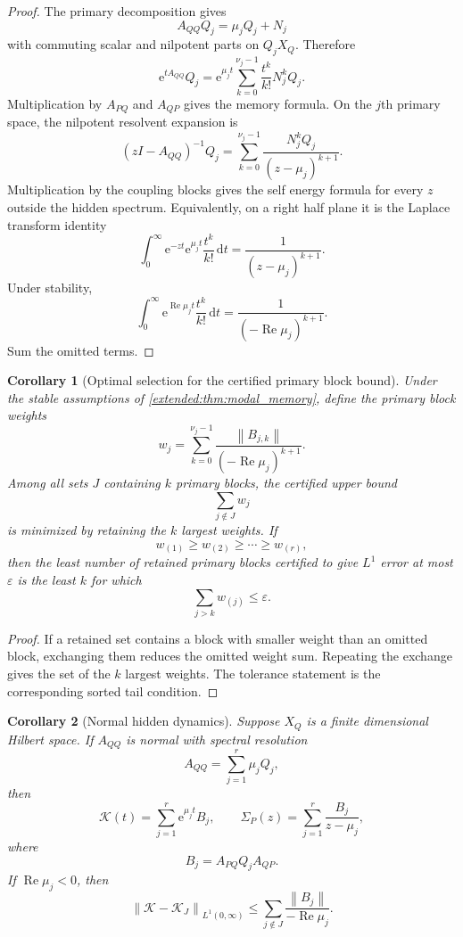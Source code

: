 \documentclass[11pt,letterpaper]{article}
\theoremstyle{plain}
\theoremstyle{plain}
\theoremstyle{plain}
\newtheorem{corollary}[corollary]{Corollary}
\theoremstyle{definition}
\theoremstyle{definition}
\theoremstyle{definition}
\theoremstyle{definition}
\theoremstyle{definition}
\theoremstyle{remark}
\theoremstyle{remark}
\theoremstyle{remark}
\theoremstyle{remark}
\theoremstyle{remark}
\newcommand{\norm}[1]{\left\lVert#1\right\rVert}
\theoremstyle{remark}
\newcommand{\Kcal}{\mathcal K}
\newcommand{\e}{\mathrm e}
\newcommand{\dd}{\,\mathrm d}
\let\KomorebiPrimitiveMathcal\mathcal
\renewcommand{\mathcal}[1]{{\KomorebiPrimitiveMathcal{#1}}}
\let\KomorebiPrimitivemathrm\mathrm
\renewcommand{\mathrm}[1]{{\KomorebiPrimitivemathrm{#1}}}
\begin{document}
\begin{proof}
The primary decomposition gives
\[
A_{QQ}Q_j=\mu_jQ_j+N_j
\]
with commuting scalar and nilpotent parts on \(Q_jX_Q\). Therefore
\[
\e^{tA_{QQ}}Q_j
=
\e^{\mu_jt}
\sum_{k=0}^{\nu_j-1}
\frac{t^k}{k!}N_j^kQ_j.
\]
Multiplication by \(A_{PQ}\) and \(A_{QP}\) gives the memory formula. On the \(j\)th primary space, the nilpotent resolvent expansion is
\[
(zI-A_{QQ})^{-1}Q_j
=
\sum_{k=0}^{\nu_j-1}
\frac{N_j^kQ_j}{(z-\mu_j)^{k+1}}.
\]
Multiplication by the coupling blocks gives the self energy formula for every \(z\) outside the hidden spectrum. Equivalently, on a right half plane it is the Laplace transform identity
\[
\int_0^\infty
\e^{-zt}\e^{\mu_jt}
\frac{t^k}{k!}
\dd t
=
\frac{1}{(z-\mu_j)^{k+1}}.
\]
Under stability,
\[
\int_0^\infty
\e^{\operatorname{Re}\mu_jt}
\frac{t^k}{k!}
\dd t
=
\frac{1}{(-\operatorname{Re}\mu_j)^{k+1}}.
\]
Sum the omitted terms.
\end{proof}

\begin{corollary}[Optimal selection for the certified primary block bound]\label{extended:record:090}\label{extended:cor:optimal_primary_selection}
Under the stable assumptions of \cref{extended:thm:modal_memory}, define the primary block weights
\[
w_j
=
\sum_{k=0}^{\nu_j-1}
\frac{\norm{B_{j,k}}}
{(-\operatorname{Re}\mu_j)^{k+1}}.
\]
Among all sets \(J\) containing \(k\) primary blocks, the certified upper bound
\[
\sum_{j\notin J}w_j
\]
is minimized by retaining the \(k\) largest weights. If
\[
w_{(1)}\geq w_{(2)}\geq\cdots\geq w_{(r)},
\]
then the least number of retained primary blocks certified to give \(L^1\) error at most \(\varepsilon\) is the least \(k\) for which
\[
\sum_{j>k}w_{(j)}\leq\varepsilon.
\]
\end{corollary}

\begin{proof}
If a retained set contains a block with smaller weight than an omitted block, exchanging them reduces the omitted weight sum. Repeating the exchange gives the set of the \(k\) largest weights. The tolerance statement is the corresponding sorted tail condition.
\end{proof}

\begin{corollary}[Normal hidden dynamics]\label{extended:record:091}\label{extended:cor:normal_modal_memory}
Suppose \(X_Q\) is a finite dimensional Hilbert space. If \(A_{QQ}\) is normal with spectral resolution
\[
A_{QQ}=\sum_{j=1}^r\mu_jQ_j,
\]
then
\[
\Kcal(t)=\sum_{j=1}^r\e^{\mu_jt}B_j,
\qquad
\Sigma_P(z)=\sum_{j=1}^r\frac{B_j}{z-\mu_j},
\]
where
\[
B_j=A_{PQ}Q_jA_{QP}.
\]
If \(\operatorname{Re}\mu_j<0\), then
\[
\norm{\Kcal-\Kcal_J}_{L^1(0,\infty)}
\leq
\sum_{j\notin J}
\frac{\norm{B_j}}{-\operatorname{Re}\mu_j}.
\]
\end{corollary}
\end{document}

